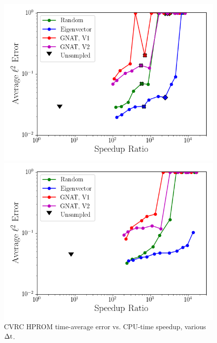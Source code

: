 \begin{figure}
	\begin{minipage}{0.49\linewidth}
		\includegraphics[width=0.99\linewidth]{Chapters/HPROMResults/Images/cvrc/deim/sampled_dt5e-7_Average_errorRaw_pareto.png}
		\subcaption{\label{fig:cvrcSampledROMErrVsTimeDt5e-7}$\dt = 5 \times \dtFOM$}
	\end{minipage}
	\begin{minipage}{0.49\linewidth}
		\includegraphics[width=0.99\linewidth]{Chapters/HPROMResults/Images/cvrc/deim/sampled_dt1e-6_Average_errorRaw_pareto.png}
		\subcaption{$\dt = 10 \times \dtFOM$}
	\end{minipage}
	\caption{\label{fig:cvrcSampledROMErrVsTime}CVRC HPROM time-average error vs. CPU-time speedup, various $\Delta \text{t}$.}
\end{figure}

